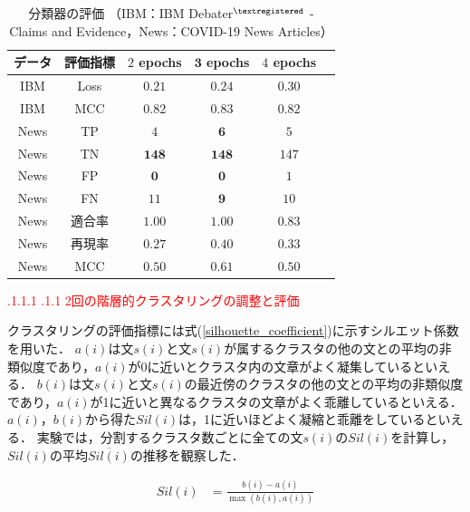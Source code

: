 \documentclass[a4paper, twocolumn, 10pt]{jarticle}
\makeatletter
\def\subsection{%
	\@startsection{subsection}{1}{\z@}%
	{.1\Cvs \@plus.1\Cdp \@minus.1\Cdp}%
	{.1\Cvs \@plus.1\Cdp}%
	{\normalfont\normalsize\bfseries}%
}
\makeatother
\begin{document}
\begin{table}[H]
  \caption{
    分類器の評価
    （IBM：IBM Debater$^{\textregistered}$ - Claims and Evidence，News：COVID-19 News Articles）
    }
  \centering
  {\tabcolsep=0.15cm
    \begin{tabular}{cccccp{6cm}}
    \hline
    データ & 評価指標 & $2$ epochs & $\mathbf{3}$ \textbf{epochs} & $4$ epochs
    \\
    \hline
    IBM & Loss & $\mathbf{0.21}$ & $0.24$ & $0.30$
    \\
    IBM & MCC & $0.82$ & $\mathbf{0.83}$ & $0.82$
    \\
    News & TP & $4$ & $\mathbf{6}$ & $5$
    \\
    News & TN & $\mathbf{148}$ & $\mathbf{148}$ & $147$
    \\
    News & FP & $\mathbf{0}$ & $\mathbf{0}$ & $1$
    \\
    News & FN & $11$ & $\mathbf{9}$ & $10$
    \\
    News & 適合率 & $\mathbf{1.00}$ & $\mathbf{1.00}$ & $0.83$
    \\
    News & 再現率 & $0.27$ & $\mathbf{0.40}$ & $0.33$
    \\
    News & MCC & $0.50$ & $\mathbf{0.61}$ & $0.50$
    \\
    \hline
    \end{tabular}
  }
  \label{classification_evaluation}
\end{table}

\textcolor{red}{\subsection{2回の階層的クラスタリングの調整と評価}}

クラスタリングの評価指標には式(\ref{silhouette_coefficient})に示すシルエット係数を用いた．
$a(i)$は文$s(i)$と文$s(i)$が属するクラスタの他の文との平均の非類似度であり，$a(i)$が0に近いとクラスタ内の文章がよく凝集しているといえる．
$b(i)$は文$s(i)$と文$s(i)$の最近傍のクラスタの他の文との平均の非類似度であり，$a(i)$が1に近いと異なるクラスタの文章がよく乖離しているといえる．
$a(i)$，$b(i)$から得た$Sil(i)$は，1に近いほどよく凝縮と乖離をしているといえる．
実験では，分割するクラスタ数ごとに全ての文$s(i)$の$Sil(i)$を計算し，$Sil(i)$の平均$\overline{Sil(i)}$の推移を観察した．

\begin{align}
  Sil(i) &= \frac{b(i) - a(i)}{\max ( b(i) , a(i))}
  \label{silhouette_coefficient}
\end{align}
\end{document}
